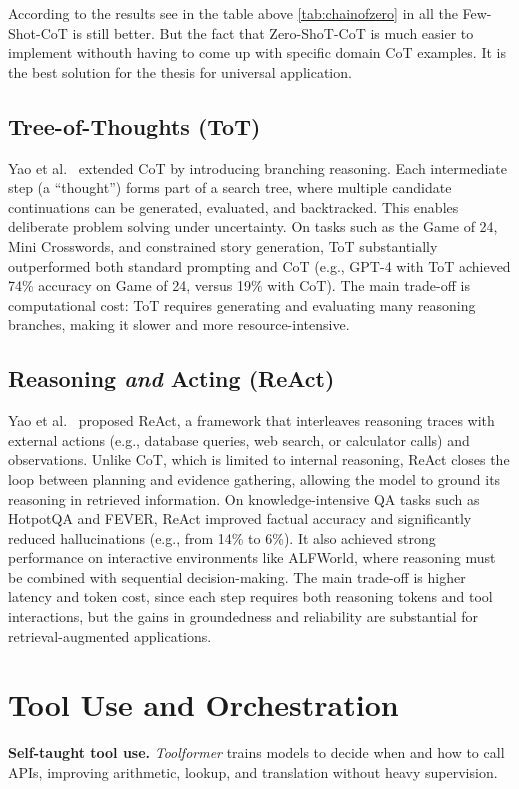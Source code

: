 According to the results see in the table above \ref{tab:chainofzero} in all the Few-Shot-CoT is still better. But the fact that Zero-ShoT-CoT is much easier to implement withouth having to come up with specific domain CoT examples. It is the best solution for the thesis for universal application.


\subsection{Tree-of-Thoughts (ToT)}
Yao et al.~\cite{treeofthought} extended CoT by introducing branching reasoning. Each intermediate step (a ``thought'') forms part of a search tree, where multiple candidate continuations can be generated, evaluated, and backtracked. This enables deliberate problem solving under uncertainty. On tasks such as the Game of 24, Mini Crosswords, and constrained story generation, ToT substantially outperformed both standard prompting and CoT (e.g., GPT-4 with ToT achieved 74\% accuracy on Game of 24, versus 19\% with CoT). The main trade-off is computational cost: ToT requires generating and evaluating many reasoning branches, making it slower and more resource-intensive.

\subsection{Reasoning \emph{and} Acting (ReAct)}
Yao et al.~\cite{react} proposed ReAct, a framework that interleaves reasoning traces with external actions (e.g., database queries, web search, or calculator calls) and observations. Unlike CoT, which is limited to internal reasoning, ReAct closes the loop between planning and evidence gathering, allowing the model to ground its reasoning in retrieved information. On knowledge-intensive QA tasks such as HotpotQA and FEVER, ReAct improved factual accuracy and significantly reduced hallucinations (e.g., from 14\% to 6\%). It also achieved strong performance on interactive environments like ALFWorld, where reasoning must be combined with sequential decision-making. The main trade-off is higher latency and token cost, since each step requires both reasoning tokens and tool interactions, but the gains in groundedness and reliability are substantial for retrieval-augmented applications.

\section{Tool Use and Orchestration}
\textbf{Self-taught tool use.} \emph{Toolformer} trains models to decide when and how to call APIs, improving arithmetic, lookup, and translation without heavy supervision.

